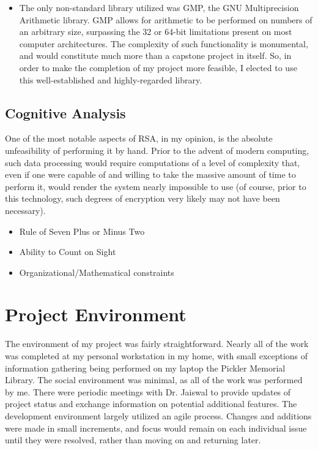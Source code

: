 \documentclass[11pt]{article}
\begin{document}
\begin{itemize}
{\begin{itemize}
{\begin{itemize}
{		}
		\item
		{The random number generation class, RandGen, is capable of generating random streams of an arbitrary and specified number of bits.
		}
		\end{itemize}
	}
	\item
	{The only non-standard library utilized was GMP, the GNU Multiprecision Arithmetic library. GMP allows for arithmetic to be performed on numbers of an arbitrary size, surpassing the 32 or 64-bit limitations present on most computer architectures. The complexity of such functionality is monumental, and would constitute much more than a capstone project in itself. So, in order to make the completion of my project more feasible, I elected to use this well-established and highly-regarded library.
	}
	\end{itemize}
}
\end{itemize}

\subsection{Cognitive Analysis}
One of the most notable aspects of RSA, in my opinion, is the absolute unfeasibility of performing it by hand. Prior to the advent of modern computing, such data processing would require computations of a level of complexity that, even if one were capable of and willing to take the massive amount of time to perform it, would render the system nearly impossible to use (of course, prior to this technology, such degrees of encryption very likely may not have been necessary).

\begin{itemize}
\item{Rule of Seven Plus or Minus Two}
\item{Ability to Count on Sight}
\item{Organizational/Mathematical constraints}
\end{itemize}

\section{Project Environment}
The environment of my project was fairly straightforward. Nearly all of the work was completed at my personal workstation in my home, with small exceptions of information gathering being performed on my laptop the Pickler Memorial Library. The social environment was minimal, as all of the work was performed by me. There were periodic meetings with Dr. Jaiswal to provide updates of project status and exchange information on potential additional features. The development environment largely utilized an agile process. Changes and additions were made in small increments, and focus would remain on each individual issue until they were resolved, rather than moving on and returning later.
\end{document}
